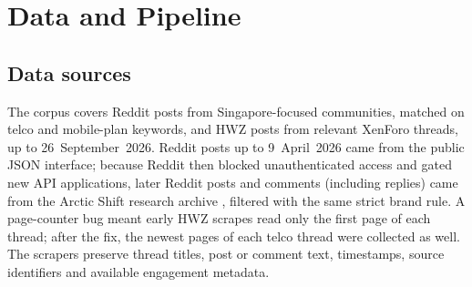 \documentclass[11pt,a4paper]{article}
\begin{document}
\section{Data and Pipeline}

\subsection{Data sources}

The corpus covers Reddit posts from Singapore-focused communities, matched on telco and mobile-plan keywords, and HWZ posts from relevant XenForo threads, up to 26~September~2026. Reddit posts up to 9~April~2026 came from the public JSON interface; because Reddit then blocked unauthenticated access and gated new API applications, later Reddit posts and comments (including replies) came from the Arctic Shift research archive \cite{arcticshift}, filtered with the same strict brand rule. A page-counter bug meant early HWZ scrapes read only the first page of each thread; after the fix, the newest pages of each telco thread were collected as well. The scrapers preserve thread titles, post or comment text, timestamps, source identifiers and available engagement metadata.
\end{document}
